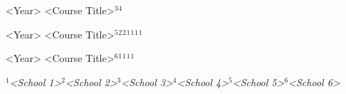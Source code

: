 
\begin{cvskills}
	
	\cvskill
	{<Year> \vspace{0.0cm}}
	{<Course Title>$^3$\enskip\cdotp\enskip <Course Title>$^4$}
	
	\cvskill
	{<Year> \vspace{0.35cm}} %
	{<Course Title>$^5$\enskip\cdotp\enskip <Course Title>$^2$\enskip\cdotp\enskip <Course Title>$^2$\enskip\cdotp\enskip <Course Title>$^1$\enskip\cdotp\enskip <Course Title>$^1$\enskip\cdotp\enskip <Course Title>$^1$\enskip\cdotp\enskip <Course Title>$^1$}
	
	\cvskill
	{<Year> \vspace{0.00cm}}
	{<Course Title>$^6$\enskip\cdotp\enskip <Course Title>$^1$\enskip\cdotp\enskip <Course Title>$^1$\enskip\cdotp\enskip<Course Title>$^1$\enskip\cdotp\enskip <Course Title>$^1$}
	
	\cvskill %
	{\vspace{0.35cm}}
	{\hfill \textit{$^1$<School 1>\enskip\cdotp\enskip $^2$<School 2>\enskip\cdotp\enskip $^3$<School 3>\enskip\cdotp\enskip $^4$<School 4>\enskip\cdotp\enskip $^5$<School 5>\enskip\cdotp\enskip $^6$<School 6>}}
	
\end{cvskills}
